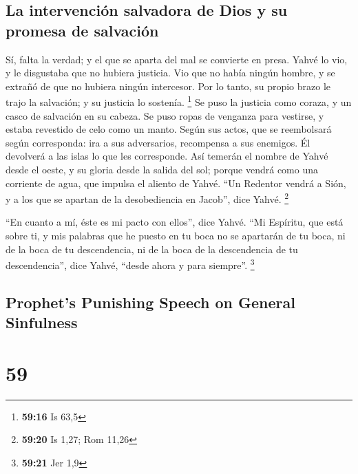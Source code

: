 \begin{paracol}{2}
\hypertarget{la-intervenciuxf3n-salvadora-de-dios-y-su-promesa-de-salvaciuxf3n}{%
\subsection{La intervención salvadora de Dios y su promesa de
salvación}\label{la-intervenciuxf3n-salvadora-de-dios-y-su-promesa-de-salvaciuxf3n}}

 Sí, falta la verdad; y el que se aparta del mal se
convierte en presa. Yahvé lo vio, y le disgustaba que no hubiera
justicia.  Vio que no había ningún hombre, y se extrañó
de que no hubiera ningún intercesor. Por lo tanto, su propio brazo le
trajo la salvación; y su justicia lo sostenía. \footnote{\textbf{59:16}
  Is 63,5}  Se puso la justicia como coraza, y un casco
de salvación en su cabeza. Se puso ropas de venganza para vestirse, y
estaba revestido de celo como un manto.  Según sus actos,
que se reembolsará según corresponda: ira a sus adversarios, recompensa
a sus enemigos. Él devolverá a las islas lo que les corresponde.
 Así temerán el nombre de Yahvé desde el oeste, y su
gloria desde la salida del sol; porque vendrá como una corriente de
agua, que impulsa el aliento de Yahvé.  ``Un Redentor
vendrá a Sión, y a los que se apartan de la desobediencia en Jacob'',
dice Yahvé. \footnote{\textbf{59:20} Is 1,27; Rom 11,26}

 ``En cuanto a mí, éste es mi pacto con ellos'', dice
Yahvé. ``Mi Espíritu, que está sobre ti, y mis palabras que he puesto en
tu boca no se apartarán de tu boca, ni de la boca de tu descendencia, ni
de la boca de la descendencia de tu descendencia'', dice Yahvé, ``desde
ahora y para siempre''. \footnote{\textbf{59:21} Jer 1,9}

\switchcolumn
\begin{otherlanguage}{english}

\hypertarget{prophets-punishing-speech-on-general-sinfulness}{%
\subsection{Prophet's Punishing Speech on General
Sinfulness}\label{prophets-punishing-speech-on-general-sinfulness}}

\hypertarget{section-117}{%
\section{59}\label{section-117}}


\end{otherlanguage}
\end{paracol}
